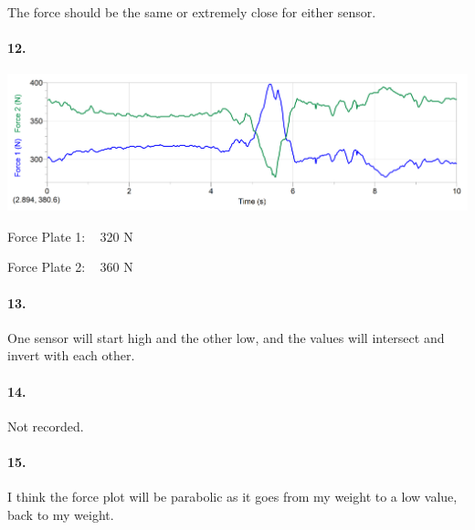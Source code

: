         \begin{mdframed}
            The force should be the same or extremely close for either sensor.
        \end{mdframed}

        \paragraph*{12.}

        \begin{mdframed}
            \includegraphics[width=\textwidth]{image17.png}

            Force Plate 1: ~ 320 N
            
            Force Plate 2: ~ 360 N
        \end{mdframed}

        \paragraph*{13.}

        \begin{mdframed}
            One sensor will start high and the other low, and the values will intersect and invert with each other.
        \end{mdframed}

        \paragraph*{14.}

        \begin{mdframed}
            Not recorded.
        \end{mdframed}

        \paragraph*{15.}

        \begin{mdframed}
            I think the force plot will be parabolic as it goes from my weight to a low value, back to my weight.
        \end{mdframed}

